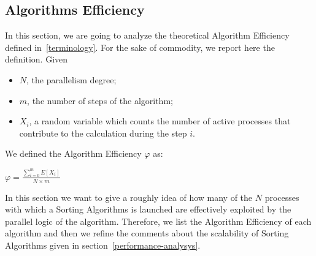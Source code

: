 \subsection{Algorithms Efficiency}
In this section, we are going to analyze the theoretical Algorithm Efficiency defined in~\ref{terminology}. For the sake of commodity, we report here the definition. Given
\begin{itemize}
\item $N$, the parallelism degree; 
\item $m$, the number of steps of the algorithm;
\item $X_i$, a random variable which counts the number of active processes that contribute to the calculation during the step $i$.
\end{itemize}
We defined the Algorithm Efficiency $\varphi$ as:
\begin{center}
$\varphi = \frac{\sum_{i=0}^m E[X_i]}{N \times m} $
\end{center}
In this section we want to give a roughly idea of how many of the $N$ processes with which a  Sorting Algorithms is launched are effectively exploited by the parallel logic of the algorithm. Therefore, we list the Algorithm Efficiency of each algorithm and then we refine the comments about the scalability of Sorting Algorithms given in section~\ref{performance-analysys}.

